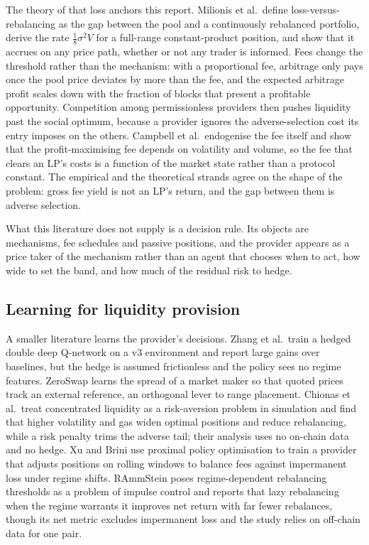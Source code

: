 The theory of that loss anchors this report. Milionis et al.\ define
loss-versus-rebalancing as the gap between the pool and a continuously
rebalanced portfolio, derive the rate $\frac{1}{8}\sigma^2V$ for a full-range
constant-product position, and show that it accrues on any price path, whether
or not any trader is informed\cite{milionis2022lvr}. Fees change the
threshold rather than the mechanism: with a proportional fee, arbitrage only
pays once the pool price deviates by more than the fee, and the expected
arbitrage profit scales down with the fraction of blocks that present a
profitable opportunity\cite{milionis2023fees}. Competition among permissionless
providers then pushes liquidity past the social optimum, because a provider
ignores the adverse-selection cost its entry imposes on the
others\cite{ma2024cost}. Campbell et al.\ endogenise the fee itself and show
that the profit-maximising fee depends on volatility and volume, so the fee
that clears an LP's costs is a function of the market state rather than a
protocol constant\cite{campbell2025optimal}. The empirical and the theoretical
strands agree on the shape of the problem: gross fee yield is not an LP's
return, and the gap between them is adverse selection.

What this literature does not supply is a decision rule. Its objects are
mechanisms, fee schedules and passive positions, and the provider appears as a
price taker of the mechanism rather than an agent that chooses when to act, how
wide to set the band, and how much of the residual risk to hedge.

\subsection{Learning for liquidity provision}

A smaller literature learns the provider's decisions. Zhang et al.\ train a
hedged double deep Q-network on a v3 environment and report large gains over
baselines, but the hedge is assumed frictionless and the policy sees no regime
features\cite{zhang2023adaptive}. ZeroSwap learns the spread of a market maker
so that quoted prices track an external reference, an orthogonal lever to
range placement\cite{nadkarni2023zeroswap}. Chionas et al.\ treat concentrated
liquidity as a risk-aversion problem in simulation and find that higher
volatility and gas widen optimal positions and reduce rebalancing, while a
risk penalty trims the adverse tail; their analysis uses no on-chain data and
no hedge\cite{chionas2026concentrated}. Xu and Brini use proximal policy
optimisation to train a provider that adjusts positions on rolling windows to
balance fees against impermanent loss under regime
shifts\cite{xu2025improving}. RAmmStein poses regime-dependent
rebalancing thresholds as a problem of impulse control and reports that lazy
rebalancing when the regime warrants it improves net return with far fewer
rebalances, though its net metric excludes impermanent loss and the study
relies on off-chain data for one pair\cite{anchuri2026rammstein}.

